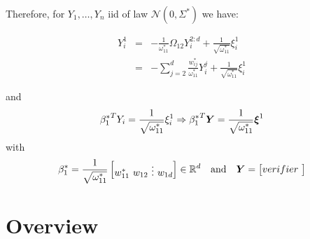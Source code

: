 Therefore, for $Y_1,\dots,Y_n$ iid of law $\mathcal N(0,\Sigma^*)$ we have:

\begin{equation}
\begin{array}{lcl}
  Y_i^1&=&-\frac{1}{\omega_{11}^*}\Omega_{12}Y_i^{2:d}+\frac{1}{\sqrt{\omega_{11}^*}}\xi^1_i\\
  &=&-\sum_{j=2}^{d}\frac{w_{ij}^*}{\omega_{11}^*}Y_i^j+\frac{1}{\sqrt{\omega_{11}^*}}\xi^1_i
\end{array}
\end{equation}

and
\begin{equation}
{\beta_1^*}^TY_i=\frac{1}{\sqrt{\omega_{11}^*}}\xi^1_i
\Rightarrow
{\beta_1^*}^T\boldsymbol Y=\frac{1}{\sqrt{\omega_{11}^*}}\boldsymbol \xi^1
\end{equation}
with
\begin{equation}
\beta_1^*=\frac{1}{\sqrt{\omega_{11}^*}}
  \begin{bmatrix}
  w_{11}^*\
  w_{12}\
  \vdots\
  w_{1d}
  \end{bmatrix}
  \in {\mathbb R}^d
  \quad \text{and}\quad \boldsymbol Y= \begin{bmatrix}
  verifier\
  \end{bmatrix}
\end{equation}

\section{Overview}

